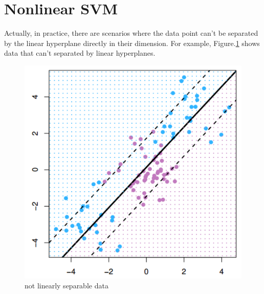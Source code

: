 \documentclass{article}
\begin{document}
\section{Nonlinear SVM}
Actually, in practice, there are scenarios where the data point can't be separated by the linear hyperplane directly in their dimension. For example, Figure.\ref{nlsd} shows data that can't separated by linear hyperplanes.
    \begin{figure}[H]
        \centering
        \includegraphics[scale=0.25]{P3.jpg}
        \caption{not linearly separable data}
        \label{nlsd}
    \end{figure}
\end{document}

